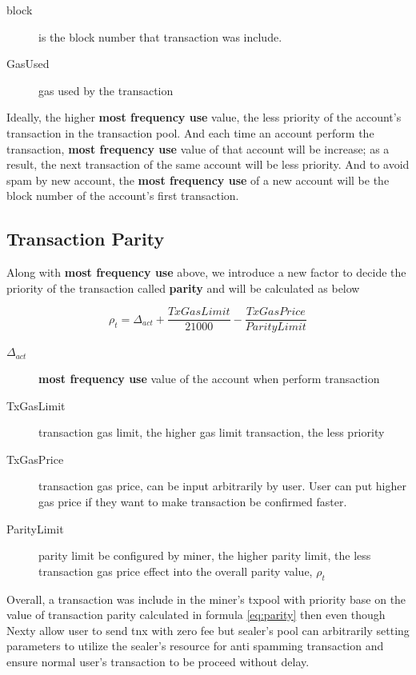 \documentclass[12pt,oneside]{amsart}
\begin{document}
\begin{multicols}{2}
\begin{description}
\item[block] is the block number that transaction was include.
\item[GasUsed] gas used by the transaction
\end{description}

Ideally, the higher \textbf{most frequency use} value, the less priority of the account's transaction in the transaction pool. And each time an account perform the transaction, \textbf{most frequency use} value of that account will be increase; as a result, the next transaction of the same account will be less priority. And to avoid spam by new account, the \textbf{most frequency use} of a new account will be the block number of the account's first transaction.

\subsection{Transaction Parity}\label{sec:parity}

Along with  \textbf{most frequency use} above, we introduce a new factor to decide the priority of the transaction called \textbf{parity} and will be calculated as below

\begin{equation}\label{eq:parity}
{\rho_t} = {\Delta_{act}} + \frac{TxGasLimit}{21000} - \frac{TxGasPrice}{ParityLimit}
\end{equation}

\begin{description}
\item[${\Delta_{act}}$] \textbf{most frequency use} value of the account when perform transaction
\item[TxGasLimit] transaction gas limit, the higher gas limit transaction, the less priority
\item[TxGasPrice] transaction gas price, can be input arbitrarily by user. User can put higher gas price if they want to make transaction be confirmed faster.
\item[ParityLimit] parity limit be configured by miner, the higher parity limit, the less transaction gas price effect into the overall parity value, ${\rho_t}$
\end{description}

Overall, a transaction was include in the miner's txpool with priority base on the value of transaction parity calculated in formula \eqref{eq:parity} then even though Nexty allow user to send tnx with zero fee but sealer's pool can arbitrarily setting parameters to utilize the sealer's resource for anti spamming transaction and ensure normal user's transaction to be proceed without delay.


\end{multicols}
\end{document}
